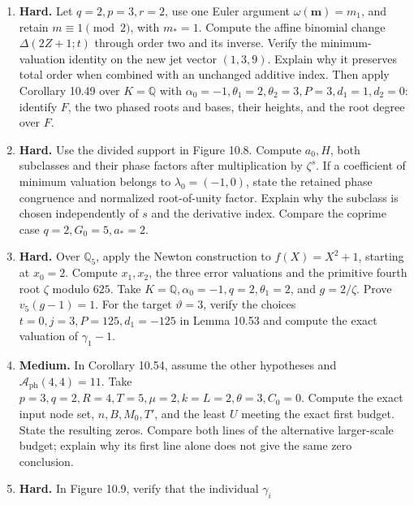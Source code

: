 \documentclass[
  11pt,
  a4paper,
]{article}
\begin{document}
\begin{enumerate}
  the coefficients \(A_0=-2,A_1=1\) give a zero total sum whose separate
  coset coefficients are nonzero. Give a similar example with odd \(s\)
  in which the full-degree hypothesis fails. Finally, at \(p=7\), use
  the local square root \(\eta\equiv3\pmod7\) of two to show that finite
  valuation precision of a total sum need not transfer to its cosets.
\item
  \textbf{Hard.} Let \(q=2,p=3,r=2\), use one Euler argument
  \(\omega(\boldsymbol m)=m_1\), and retain \(m\equiv1\pmod2\), with
  \(m_*=1\). Compute the affine binomial change \(\Delta(2Z+1;t)\)
  through order two and its inverse. Verify the minimum-valuation
  identity on the new jet vector \((1,3,9)\). Explain why it preserves
  total order when combined with an unchanged additive index. Then apply
  Corollary 10.49 over \(K=\mathbb Q\) with
  \(\alpha_0=-1,\theta_1=2,\theta_2=3,P=3,d_1=1,d_2=0\): identify \(F\),
  the two phased roots and bases, their heights, and the root degree
  over \(F\).
\item
  \textbf{Hard.} Use the divided support in Figure 10.8. Compute
  \(a_0,H\), both subclasses and their phase factors after
  multiplication by \(\zeta^s\). If a coefficient of minimum valuation
  belongs to \(\lambda_0=(-1,0)\), state the retained phase congruence
  and normalized root-of-unity factor. Explain why the subclass is
  chosen independently of \(s\) and the derivative index. Compare the
  coprime case \(q=2,G_0=5,a_*=2\).
\item
  \textbf{Hard.} Over \(\mathbb Q_5\), apply the Newton construction to
  \(f(X)=X^2+1\), starting at \(x_0=2\). Compute \(x_1,x_2\), the three
  error valuations and the primitive fourth root \(\zeta\) modulo
  \(625\). Take \(K=\mathbb Q,\alpha_0=-1,q=2,\theta_1=2\), and
  \(g=2/\zeta\). Prove \(v_5(g-1)=1\). For the target \(\vartheta=3\),
  verify the choices \(t=0,j=3,P=125,d_1=-125\) in Lemma 10.53 and
  compute the exact valuation of \(\gamma_1-1\).
\item
  \textbf{Medium.} In Corollary 10.54, assume the other hypotheses and
  \(\mathcal A_{\mathrm{ph}}(4,4)=11\). Take
  \(p=3,q=2,R=4,T=5,\mu=2,k=L=2,\theta=3,C_0=0\). Compute the exact
  input node set, \(n,B,M_0,T'\), and the least \(U\) meeting the exact
  first budget. State the resulting zeros. Compare both lines of the
  alternative larger-scale budget; explain why its first line alone does
  not give the same zero conclusion.
\item
  \textbf{Hard.} In Figure 10.9, verify that the individual \(\gamma_i\)

\end{enumerate}
\end{document}
